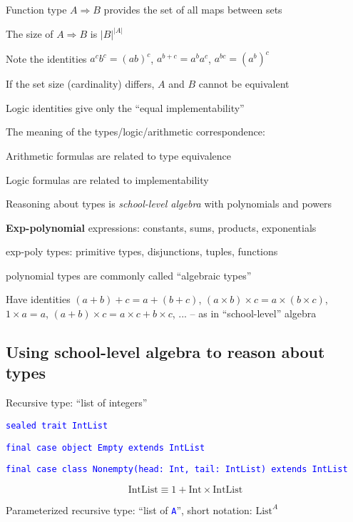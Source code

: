Function type $A\Rightarrow B$ provides the set of all maps between
sets

The size of $A\Rightarrow B$ is $\left|B\right|^{\left|A\right|}$

Note the identities $a^{c}b^{c}=\left(ab\right)^{c}$, $a^{b+c}=a^{b}a^{c}$,
$a^{bc}=\left(a^{b}\right)^{c}$

If the set size (cardinality) differs, $A$ and $B$ cannot be equivalent 

Logic identities give only the ``equal implementability''

The meaning of the types/logic/arithmetic correspondence:

Arithmetic formulas are related to type equivalence

Logic formulas are related to implementability

Reasoning about types is \emph{school-level algebra} with polynomials
and powers

\textbf{Exp-polynomial }expressions: constants, sums, products, exponentials

exp-poly types: primitive types, disjunctions, tuples, functions

polynomial types are commonly called ``algebraic types''

Have identities $\left(a+b\right)+c=a+\left(b+c\right)$, $\left(a\times b\right)\times c=a\times(b\times c)$,
$1\times a=a$, $\left(a+b\right)\times c=a\times c+b\times c$, ...
– as in ``school-level'' algebra

\subsection{Using school-level algebra to reason about types}

Recursive type: ``list of integers''

\texttt{\textcolor{blue}{\footnotesize{}sealed trait IntList}}{\footnotesize\par}

\texttt{\textcolor{blue}{\footnotesize{}final case object Empty extends
IntList}}{\footnotesize\par}

\texttt{\textcolor{blue}{\footnotesize{}final case class Nonempty(head: Int,
tail: IntList) extends IntList}}{\footnotesize\par}

\[
\text{IntList}\equiv1+\text{Int}\times\text{IntList}
\]

Parameterized recursive type: ``list of \texttt{\textcolor{blue}{\footnotesize{}A}}'',
short notation: $\text{List}^{A}$

